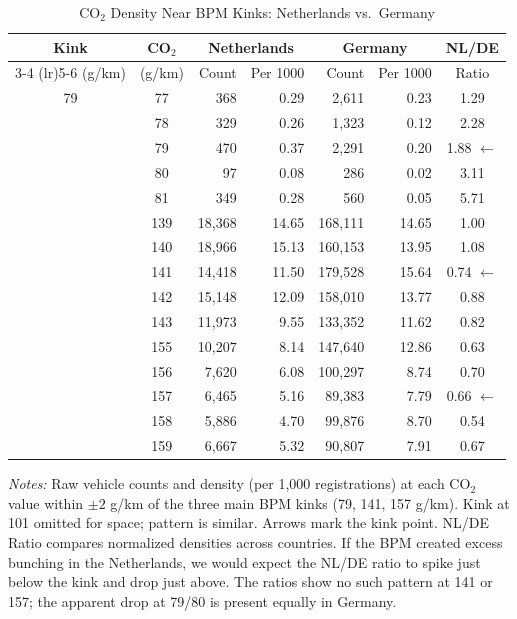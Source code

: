 \begin{table}[t]
\centering
\begin{threeparttable}
\caption{CO$_2$ Density Near BPM Kinks: Netherlands vs.\ Germany}
\label{tab:density}
\begin{tabular}{ccrrrrc}
\toprule
Kink & CO$_2$ & \multicolumn{2}{c}{Netherlands} & \multicolumn{2}{c}{Germany} & NL/DE \\
\cmidrule(lr){3-4} \cmidrule(lr){5-6}
(g/km) & (g/km) & Count & Per 1000 & Count & Per 1000 & Ratio \\
\midrule
79 & 77 & 368 & 0.29 & 2,611 & 0.23 & 1.29  \\
 & 78 & 329 & 0.26 & 1,323 & 0.12 & 2.28  \\
 & 79 & 470 & 0.37 & 2,291 & 0.20 & 1.88 $\leftarrow$ \\
 & 80 & 97 & 0.08 & 286 & 0.02 & 3.11  \\
 & 81 & 349 & 0.28 & 560 & 0.05 & 5.71  \\
\addlinespace
141 & 139 & 18,368 & 14.65 & 168,111 & 14.65 & 1.00  \\
 & 140 & 18,966 & 15.13 & 160,153 & 13.95 & 1.08  \\
 & 141 & 14,418 & 11.50 & 179,528 & 15.64 & 0.74 $\leftarrow$ \\
 & 142 & 15,148 & 12.09 & 158,010 & 13.77 & 0.88  \\
 & 143 & 11,973 & 9.55 & 133,352 & 11.62 & 0.82  \\
\addlinespace
157 & 155 & 10,207 & 8.14 & 147,640 & 12.86 & 0.63  \\
 & 156 & 7,620 & 6.08 & 100,297 & 8.74 & 0.70  \\
 & 157 & 6,465 & 5.16 & 89,383 & 7.79 & 0.66 $\leftarrow$ \\
 & 158 & 5,886 & 4.70 & 99,876 & 8.70 & 0.54  \\
 & 159 & 6,667 & 5.32 & 90,807 & 7.91 & 0.67  \\
\bottomrule
\end{tabular}
\begin{tablenotes}
\item \textit{Notes:} Raw vehicle counts and density (per 1,000 registrations) at each CO$_2$ value within $\pm 2$ g/km of the three main BPM kinks (79, 141, 157 g/km). Kink at 101 omitted for space; pattern is similar. Arrows mark the kink point. NL/DE Ratio compares normalized densities across countries. If the BPM created excess bunching in the Netherlands, we would expect the NL/DE ratio to spike just below the kink and drop just above. The ratios show no such pattern at 141 or 157; the apparent drop at 79/80 is present equally in Germany.
\end{tablenotes}
\end{threeparttable}
\end{table}

